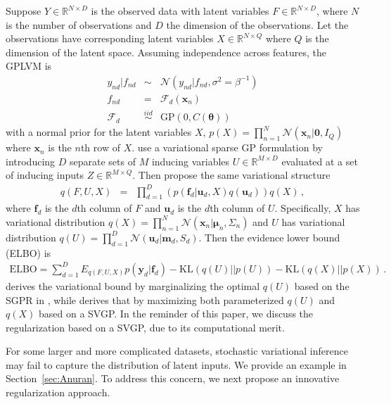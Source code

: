 \documentclass{article}
\begin{document}
Suppose $Y \in \mathbb{R}^{N\times D}$ is the observed data with latent variables $F \in \mathbb{R}^{N\times D}$, where $N$ is the number of observations and $D$ the dimension of the observations. Let the observations have corresponding latent variables $X \in \mathbb{R}^{N \times Q}$ where $Q$ is the dimension of the latent space. Assuming independence across features, the GPLVM is 
\begin{eqnarray}
y_{nd}|f_{nd} & \sim & \mathcal{N}(y_{nd}|f_{nd}, \sigma^2 = \beta^{-1}) \nonumber \\
f_{nd} & = & \mathcal{F}_d(\bm x_n) \nonumber \\
\mathcal{F}_d & \stackrel{iid}{\sim} & \mathrm{GP}(0, C(\bm\theta)) 
\label{GPLVM}
\end{eqnarray}
with a normal prior for the latent variables $X$, 
$p(X) = \prod_{n = 1}^{N}\mathcal{N}(\bm x_n|\bm 0, I_Q)$
where $\bm x_n$ is the $n$th row of $X$. \cite{Titsias_2009, Titsias_2010} use a variational sparse GP formulation by introducing $D$ separate sets of $M$ inducing variables $U \in \mathbb{R}^{M\times D}$ evaluated at a set of inducing inputs $Z\in\mathbb{R}^{M\times Q}$. Then \cite{Titsias_2010, Hensman_2013} propose the same variational structure 
\begin{eqnarray}
q(F, U, X) & = & \prod_{d = 1}^D\left(p(\bm f_d| \bm u_d, X) q(\bm u_d)\right) q(X)\,,
\label{GPLVM_VD}
\end{eqnarray}
where $\bm f_d$ is the $d$th column of $F$ and $\bm u_d$ is the $d$th column of $U$. Specifically, $X$ has variational distribution $q(X) = \prod_{n = 1}^N\mathcal{N}(\bm x_n|\bm \mu_n, \Sigma_n)$ and $U$ has variational distribution $q(U) = \prod_{d = 1}^D\mathcal{N}(\bm u_d| \bm m_d, S_d)$. 
Then the evidence lower bound (ELBO) is 
\begin{eqnarray}
\mathrm{ELBO} = \sum_{d = 1}^{D}E_{q(F, U, X)}p(\bm y_d|\bm f_d) - \mathrm{KL}(q(U)||p(U)) - \mathrm{KL}(q(X)||p(X)) \,.
\end{eqnarray}	
\cite{Titsias_2010} derives the variational bound by marginalizing the optimal $q(U)$ based on the SGPR in \cite{Titsias_2009}, while \cite{Hensman_2013} derives that by maximizing both parameterized $q(U)$ and $q(X)$ based on a SVGP. In the reminder of this paper, we discuss the regularization based on a SVGP, due to its computational merit. 

For some larger and more complicated datasets, stochastic variational inference may fail to capture the distribution of latent inputs. We provide an example in Section~\ref{sec:Anuran}. To address this concern, we next propose an innovative regularization approach.
\end{document}
